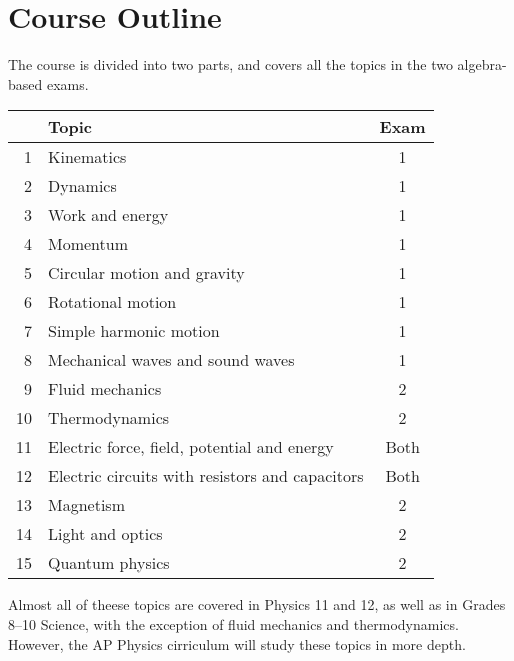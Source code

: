 \documentclass{../../oss-handout}
\begin{document}
\section*{Course Outline}
The course is divided into two parts, and covers all the topics in the two
algebra-based exams.
\begin{center}
  \begin{tabular}{rl|c}
    & \textbf{Topic} & \textbf{Exam}\\
    \hline
    1 & Kinematics & 1 \\
    2 & Dynamics   & 1 \\
    3 & Work and energy & 1 \\
    4 & Momentum   & 1 \\
    5 & Circular motion and gravity & 1 \\
    6 & Rotational motion & 1 \\
    7 & Simple harmonic motion & 1 \\
    8 & Mechanical waves and sound waves & 1 \\
    9 & Fluid mechanics & 2 \\
    10 & Thermodynamics & 2 \\
    11 & Electric force, field, potential and energy & Both \\
    12 & Electric circuits with resistors and capacitors & Both \\
    13 & Magnetism & 2 \\
    14 & Light and optics & 2 \\
    15 & Quantum physics & 2
  \end{tabular}
\end{center}
Almost all of theese topics are covered in Physics 11 and 12, as well as in
Grades 8--10 Science, with the exception of fluid mechanics and thermodynamics.
However, the AP Physics cirriculum will study these topics in more depth.
\end{document}
